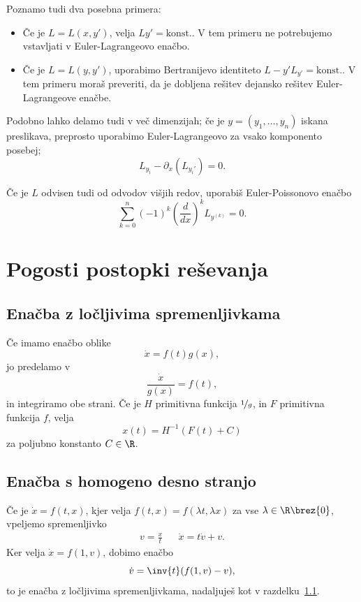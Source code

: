 Poznamo tudi dva posebna primera:
\begin{itemize}
\item Če je $L = L(x, y')$, velja $Ly' = \text{konst.}$.
  V tem primeru ne potrebujemo vstavljati v Euler-Lagrangeovo enačbo.
\item Če je $L = L(y, y')$, uporabimo Bertranijevo identiteto $L - y' L_{y'} =
  \text{konst.}$.
  V tem primeru moraš preveriti, da je dobljena rešitev dejansko rešitev
  Euler-Lagrangeove enačbe.
\end{itemize}

Podobno lahko delamo tudi v več dimenzijah; če je $y = (y_1, \ldots, y_n)$
iskana preslikava, preprosto uporabimo Euler-Lagrangeovo za vsako komponento
posebej;
\[
  L_{y_i} - \partial_x (L_{y_i'}) = 0.
\]

Če je $L$ odvisen tudi od odvodov višjih redov, uporabiš Euler-Poissonovo enačbo
\[
  \sum_{k=0}^n (-1)^k (\frac{d}{dx})^k L_{y^{(k)}} = 0.
\]

\section{Pogosti postopki reševanja}%

\subsection{Enačba z ločljivima spremenljivkama}%
\label{sec:locljive-spremenljivke}

Če imamo enačbo oblike
\[
  \dot{x} = f(t) g(x),
\]
jo predelamo v
\[
  \frac{\dot{x}}{g(x)} = f(t),
\]
in integriramo obe strani.
Če je $H$ primitivna funkcija $\nicefrac{1}{g}$, in $F$ primitivna funkcija $f$,
velja
\[
  x(t) = H^{-1}(F(t) + C)
\]
za poljubno konstanto $C \in \R$.

\subsection{Enačba s homogeno desno stranjo}%
\label{sec:homogena-desna-stran}

Če je $\dot{x} = f(t, x)$, kjer velja $f(t, x) = f(\lambda t, \lambda x)$ za vse
$\lambda \in \R\brez\{0\}$, vpeljemo spremenljivko
\begin{align*}
  v = \frac{x}{t} && \dot{x} = t \dot{v} + v.
\end{align*}
Ker velja $\dot{x} = f(1, v)$, dobimo enačbo
\[
  \dot{v} = \inv{t} (f(1, v) - v),
\]
to je enačba z ločljivima spremenljivkama, nadaljuješ kot v
razdelku~\ref{sec:locljive-spremenljivke}.

